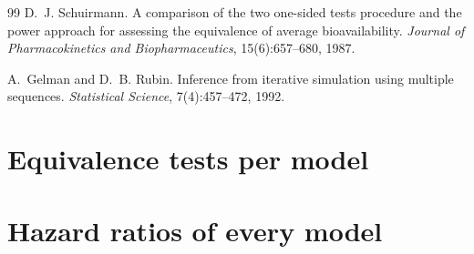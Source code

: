 \documentclass[11pt]{article}
\begin{document}
\begin{thebibliography}{99}
D.~J. Schuirmann.
\newblock A comparison of the two one-sided tests procedure and the power approach for
assessing the equivalence of average bioavailability.
\newblock \emph{Journal of Pharmacokinetics and Biopharmaceutics}, 15(6):657--680, 1987.

A.~Gelman and D.~B. Rubin.
\newblock Inference from iterative simulation using multiple sequences.
\newblock \emph{Statistical Science}, 7(4):457--472, 1992.

\end{thebibliography}

\appendix
\section{Equivalence tests per model}



\section{Hazard ratios of every model}


\end{document}
